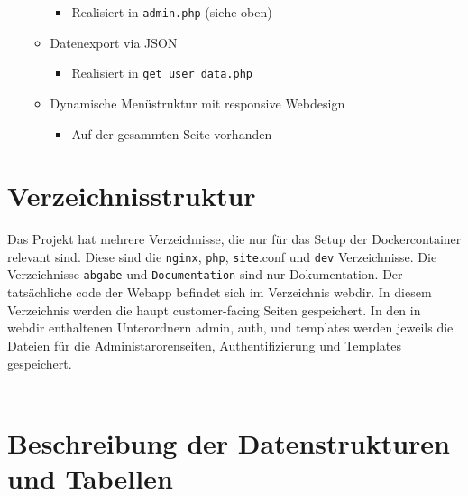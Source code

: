 \documentclass{article}
\begin{document}
\begin{itemize}
\begin{itemize}
\begin{itemize}
                \item Realisiert in \verb|admin.php| (siehe oben)
            \end{itemize}
        \item Datenexport via JSON
            \begin{itemize}
                \item Realisiert in \verb|get_user_data.php|
            \end{itemize}
        \item Dynamische Menüstruktur mit responsive Webdesign
            \begin{itemize}
                \item Auf der gesammten Seite vorhanden
            \end{itemize}
    \end{itemize}
\end{itemize}
\label{tab:my_label}

\pagebreak
\section{Verzeichnisstruktur}
Das Projekt hat mehrere Verzeichnisse, die nur für das Setup der Dockercontainer relevant sind. 
Diese sind die \verb|nginx|, \verb|php|, \verb|site|.conf und \verb|dev| Verzeichnisse. 
Die Verzeichnisse \verb|abgabe| und \verb|Documentation| sind nur Dokumentation.
Der tatsächliche code der Webapp befindet sich im Verzeichnis webdir. 
In diesem Verzeichnis werden die haupt customer-facing Seiten gespeichert. 
In den in webdir enthaltenen Unterordnern admin, auth, und templates werden jeweils die 
Dateien für die Administarorenseiten, Authentifizierung und Templates gespeichert.
\\
\\



\pagebreak
\section{Beschreibung der Datenstrukturen \newline und Tabellen}
\end{document}
